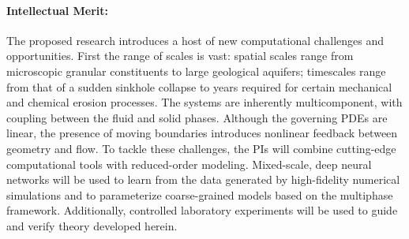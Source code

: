 \documentclass[11pt]{article}
\begin{document}
\paragraph{Intellectual Merit:} The proposed research introduces a host of new computational challenges and opportunities. First the range of scales is vast: spatial scales range from microscopic granular constituents to large geological aquifers; timescales range from that of a sudden sinkhole collapse to years required for certain mechanical and chemical erosion processes. The systems are inherently multicomponent, with coupling between the fluid and solid phases. Although the governing PDEs are linear, the presence of moving boundaries introduces nonlinear feedback between geometry and flow. To tackle these challenges, the PIs will combine cutting-edge computational tools with reduced-order modeling. Mixed-scale, deep neural networks will be used to learn from the data generated by high-fidelity numerical simulations and to parameterize coarse-grained models based on the multiphase framework. Additionally, controlled laboratory experiments will be used to guide and verify theory developed herein.  
\end{document}

